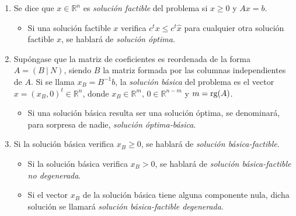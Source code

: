 \documentclass[11pt]{report}
\theoremstyle{mytheorem}
\theoremstyle{mydefinition}
\theoremstyle{myexample}
\newcommand{\R}{\mathbb R}
\begin{document}
\begin{enumerate}
    \item Se dice que $x \in \R^n$ es {\textit{solución factible}} del problema si $x \geq 0$ y $Ax = b$. 
    \begin{itemize}
        \item Si una solución factible $x$ verifica $c^tx \leq c^t\hat{x}$ para cualquier otra solución factible $\hat{x}$, se hablará de {\textit{solución óptima}}.
    \end{itemize}
    \item Supóngase que la matriz de coeficientes es reordenada de la forma $A = (B \ | \ N)$, siendo $B$ la matriz formada por las columnas independientes de $A$. Si se llama $x_B = B^{-1} b$, la {\textit{solución básica}} del problema es el vector $x = (x_B,0)^t \in \R^n$, donde $x_B \in \R^m, \, 0 \in \R^{n-m}$ y $m = \textup{rg}(A)$. \begin{itemize}
        \item Si una solución básica resulta ser una solución óptima, se denominará, para sorpresa de nadie, \textit{{solución óptima-básica}}.
    \end{itemize}
    \item Si la solución básica verifica $x_B \geq 0$, se hablará de {\textit{solución básica-factible}}. \begin{itemize}
        \item Si la solución básica verifica $x_B > 0$, se hablará de {\textit{solución básica-factible no degenerada}}.
        \item Si el vector $x_B$ de la solución básica tiene alguna componente nula, dicha solución se llamará {\textit{solución básica-factible degenerada}}.
    \end{itemize}
\end{enumerate}
\end{document}
